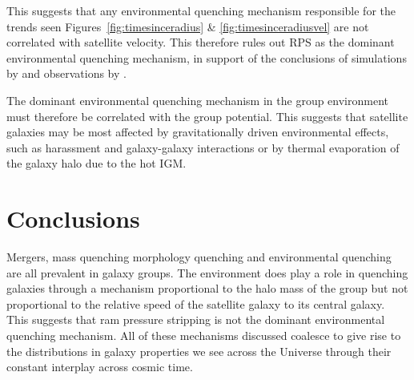 This suggests that any environmental quenching mechanism responsible for the trends seen Figures~\ref{fig:timesinceradius} \& \ref{fig:timesinceradiusvel} are not correlated with satellite velocity. This therefore rules out RPS as the dominant environmental quenching mechanism, in support of the conclusions of simulations by\citet{emerick16, fillingham16} and observations by \citet{mcgee14}. 

The dominant environmental quenching mechanism in the group environment must therefore be correlated with the group potential. This suggests that satellite galaxies may be most affected by gravitationally driven environmental effects, such as harassment and galaxy-galaxy interactions or by thermal evaporation of the galaxy halo due to the hot IGM. 


\section{Conclusions}\label{sec:conc}

Mergers, mass quenching morphology quenching and environmental quenching are all prevalent in galaxy groups. The environment does play a role in quenching galaxies through a mechanism proportional to the halo mass of the group but not proportional to the relative speed of the satellite galaxy to its central galaxy. This suggests that ram pressure stripping is not the dominant environmental quenching mechanism. All of these mechanisms discussed coalesce to give rise to the distributions in galaxy properties we see across the Universe through their constant interplay across cosmic time. 

